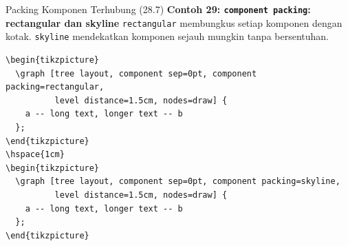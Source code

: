 \documentclass[aspectratio=169]{beamer}
\begin{document}
\begin{frame}{Packing Komponen Terhubung (28.7)}
\textbf{Contoh 29: \texttt{component packing}: rectangular dan skyline}
\texttt{rectangular} membungkus setiap komponen dengan kotak. \texttt{skyline} mendekatkan komponen sejauh mungkin tanpa bersentuhan.
\begin{lstlisting}
\begin{tikzpicture}
  \graph [tree layout, component sep=0pt, component packing=rectangular,
          level distance=1.5cm, nodes=draw] {
    a -- long text, longer text -- b
  };
\end{tikzpicture}
\hspace{1cm}
\begin{tikzpicture}
  \graph [tree layout, component sep=0pt, component packing=skyline,
          level distance=1.5cm, nodes=draw] {
    a -- long text, longer text -- b
  };
\end{tikzpicture}
\end{lstlisting}
\begin{center}\end{center}



\end{frame}
\end{document}
